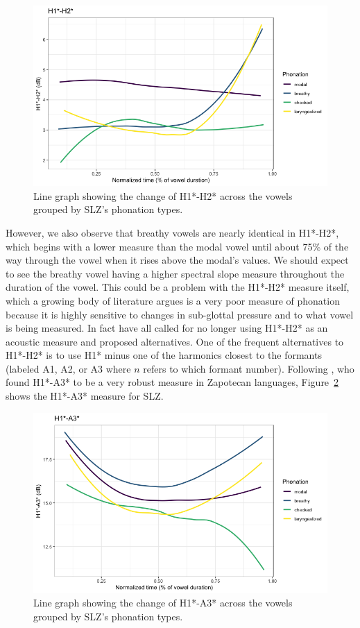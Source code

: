 \documentclass[12pt, letterpaper]{article}
\begin{document}
\begin{figure}[!h]
	\centering
	\includegraphics[width=.75\linewidth]{Images/h1h2.png}
	\caption{Line graph showing the change of H1*-H2* across the vowels grouped by SLZ's phonation types.}
	\label{fig:H1H2}
\end{figure}

However, we also observe that breathy vowels are nearly identical in H1*-H2*, which begins with a lower measure than the modal vowel until about 75\%  of the way through the vowel when it rises above the modal's values. We should expect to see the breathy vowel having a higher spectral slope measure throughout the duration of the vowel. This could be a problem with the H1*-H2* measure itself, which a growing body of literature argues is a very poor measure of phonation because it is highly sensitive to changes in sub-glottal pressure and to what vowel is being measured. In fact \citet{simpsonFirstSecondHarmonics2012,garellekPhoneticsVoice2019,chaiH1H2Acoustic2022} have all called for no longer using H1*-H2* as an acoustic measure and proposed alternatives. One of the frequent alternatives to H1*-H2* is to use H1* minus one of the harmonics closest to the formants (labeled A1, A2, or A3 where $n$ refers to which formant number). Following \citet{espositoVariationContrastivePhonation2010}, who found H1*-A3* to be a very robust measure in Zapotecan languages, Figure~\ref{fig:H1A3} shows the H1*-A3* measure for SLZ. 
\begin{figure}[!h]
	\centering
	\includegraphics[width=.75\linewidth]{Images/h1a3.png}
	\caption{Line graph showing the change of H1*-A3* across the vowels grouped by SLZ's phonation types.}
	\label{fig:H1A3}
\end{figure}
\end{document}
